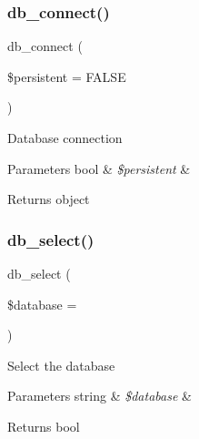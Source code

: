 \subsubsection{\texorpdfstring{db\+\_\+connect()}{db\_connect()}}
{\footnotesize\ttfamily db\+\_\+connect (\begin{DoxyParamCaption}\item[{}]{\$persistent = {\ttfamily FALSE} }\end{DoxyParamCaption})}

Database connection


\begin{DoxyParams}[1]{Parameters}
bool & {\em \$persistent} & \\
\hline
\end{DoxyParams}
\begin{DoxyReturn}{Returns}
object 
\end{DoxyReturn}
\mbox{\label{class_c_i___d_b__mysqli__driver_a18ae9c21870b30b45337c5e3626190cc}} 
\subsubsection{\texorpdfstring{db\+\_\+select()}{db\_select()}}
{\footnotesize\ttfamily db\+\_\+select (\begin{DoxyParamCaption}\item[{}]{\$database = {\ttfamily \textquotesingle{}\textquotesingle{}} }\end{DoxyParamCaption})}

Select the database


\begin{DoxyParams}[1]{Parameters}
string & {\em \$database} & \\
\hline
\end{DoxyParams}
\begin{DoxyReturn}{Returns}
bool 
\end{DoxyReturn}
\mbox{\label{class_c_i___d_b__mysqli__driver_a43b8d30b879d4f09ceb059b02af2bc02}} 
